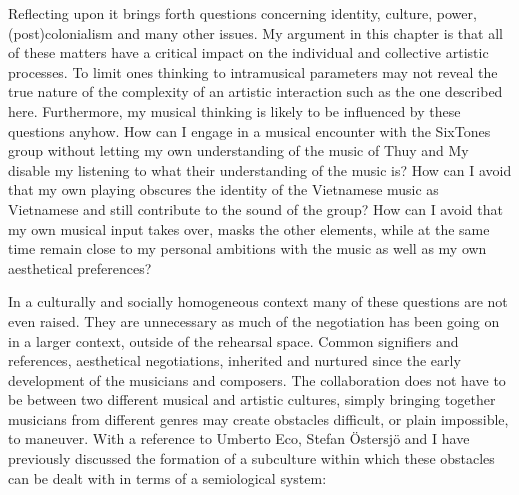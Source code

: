 \documentclass[a4paper]{article}
\begin{document}
Reflecting upon it brings forth questions concerning identity, culture, power, (post)colonialism and many other issues. My argument in this chapter is that all of these matters have a critical impact on the individual and collective artistic processes. To limit ones thinking to intramusical parameters may not reveal the true nature of the complexity of an artistic interaction such as the one described here.
Furthermore, my musical thinking is likely to be influenced by these questions anyhow. How can I engage in a musical encounter with the SixTones group without letting my own understanding of the music of Thuy and My disable my listening to what their understanding of the music is? How can I avoid that my own playing obscures the identity of the Vietnamese music as Vietnamese and still contribute to the sound of the group? How can I avoid that my own musical input takes over, masks the other elements, while at the same time remain close to my personal ambitions with the music as well as my own aesthetical preferences? 

In a culturally and socially homogeneous context many of these questions are not even raised. They are unnecessary as much of the negotiation has been going on in a larger context, outside of the rehearsal space. Common signifiers and references, aesthetical negotiations, inherited and nurtured since the early development of the musicians and composers. The collaboration does not have to be between two different musical and artistic cultures, simply bringing together musicians from different genres may create obstacles difficult, or plain impossible, to maneuver. With a reference to Umberto Eco, Stefan Östersjö and I have previously discussed the formation of a subculture within which these obstacles can be dealt with in terms of a semiological system:
\end{document}
